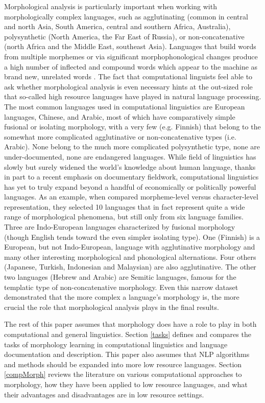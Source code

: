 \documentclass[12pt]{article}
\begin{document}
Morphological analysis is particularly important when working with morphologically complex languages, such as agglutinating (common in central and north Asia, South America, central and southern Africa, Australia), polysynthetic (North America, the Far East of Russia), or non-concatenative (north Africa and the Middle East, southeast Asia). Languages that build words from multiple morphemes or via significant morphophonological changes produce a high number of inflected and compound words which appear to the machine as brand new, unrelated words \cite{dreyer_discovering_2011,goldsmith_computational_2017,hammarstrom_unsupervised_2011,kann_neural_2016,ruokolainen_supervised_2013}. The fact that computational linguists feel able to ask whether morphological analysis is even necessary hints at the out-sized role that so-called high resource languages have played in natural language processing. The most common languages used in computational linguistics are European languages, Chinese, and Arabic, most of which have comparatively simple fusional or isolating morphology, with a very few (e.g. Finnish) that belong to the somewhat more complicated agglutinative or non-concatenative types (i.e. Arabic). None belong to the much more complicated polysynthetic type, none are under-documented, none are endangered languages. While field of linguistics has slowly but surely widened the world's knowledge about human language, thanks in part to a recent emphasis on documentary fieldwork, computational linguistics has yet to truly expand beyond a handful of economically or politically powerful languages. As an example, when  compared morpheme-level versus character-level representation, they selected 10 languages that in fact represent quite a wide range of morphological phenomena, but still only from six language families. Three are Indo-European languages characterized by fusional morphology (though English tends toward the even simpler isolating type). One (Finnish) is a European, but not Indo-European, language with agglutinative morphology and many other interesting morphological and phonological alternations. Four others (Japanese, Turkish, Indonesian and Malaysian) are also agglutinative. The other two languages (Hebrew and Arabic) are Semitic languages, famous for the templatic type of non-concatenative morphology. Even this narrow dataset demonstrated that the more complex a language’s morphology is, the more crucial the role that morphological analysis plays in the final results. 
 
The rest of this paper assumes that morphology does have a role to play in both computational and general linguistics. Section \ref{tasks} defines and compares the tasks of morphology learning in computational linguistics and language documentation and description. This paper also assumes that NLP algorithms and methods should be expanded into more low resource languages. Section \ref{compMorph} reviews the literature on various computational approaches to morphology, how they have been applied to low resource languages, and what their advantages and disadvantages are in low resource settings.
\end{document}
